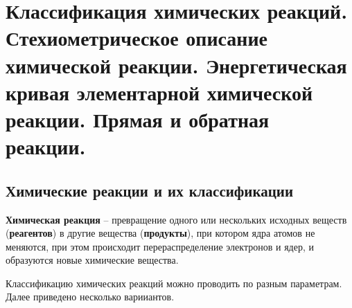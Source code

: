 \section{Классификация химических реакций. Стехиометрическое описание химической реакции. Энергетическая кривая элементарной химической реакции. Прямая и обратная реакции.}
\subsection{Химические реакции и их классификации}
\textbf{Химическая реакция}  -- превращение одного или нескольких исходных веществ (\textbf{реагентов}) в другие вещества (\textbf{продукты}), при котором ядра атомов не меняются, при этом происходит перераспределение электронов и ядер, и образуются новые химические вещества.

Классификацию химических реакций можно проводить по разным параметрам. Далее приведено несколько варииантов.
